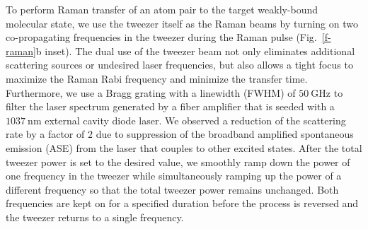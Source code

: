 \documentclass[aps,prl,twocolumn,10pt,superscriptaddress]{revtex4-1}
\newcommand{\Na}{\mathrm{Na}}
\newcommand{\Cs}{\mathrm{Cs}}
\begin{document}
To perform Raman transfer of an atom pair to the target weakly-bound molecular state, we use the tweezer itself as the Raman beams by turning on two co-propagating frequencies in the tweezer during the Raman pulse (Fig.~\ref{f-raman}b inset). The dual use of the tweezer beam not only eliminates additional scattering sources or undesired laser frequencies, but also allows a tight focus to maximize the Raman Rabi frequency and minimize the transfer time. Furthermore, we use a Bragg grating with a linewidth (FWHM) of $50 ~\mathrm{GHz}$ to filter the laser spectrum generated by a fiber amplifier that is seeded with a $1037~\mathrm{nm}$ external cavity diode laser. We observed a reduction of the scattering rate by a factor of $2$ due to suppression of the broadband amplified spontaneous emission (ASE) from the laser that couples to other excited states. %
After the total tweezer power is set to the desired value, we smoothly ramp down the power of one frequency in the tweezer while simultaneously ramping up the power of a different frequency so that the total tweezer power remains unchanged. Both frequencies are kept on for a specified duration before the process is reversed and the tweezer returns to a single frequency.



\end{document}
